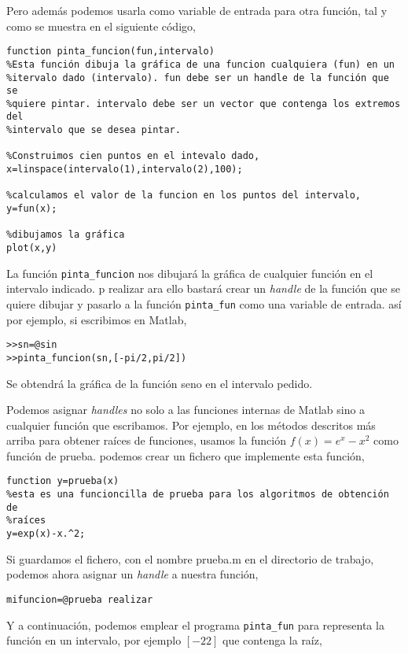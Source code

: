 Pero además podemos usarla como variable de entrada para otra función, tal y como se muestra en el siguiente código,

\begin{verbatim}
function pinta_funcion(fun,intervalo)
%Esta función dibuja la gráfica de una funcion cualquiera (fun) en un
%itervalo dado (intervalo). fun debe ser un handle de la función que se
%quiere pintar. intervalo debe ser un vector que contenga los extremos del
%intervalo que se desea pintar.

%Construimos cien puntos en el intevalo dado,
x=linspace(intervalo(1),intervalo(2),100);

%calculamos el valor de la funcion en los puntos del intervalo,
y=fun(x);

%dibujamos la gráfica
plot(x,y)
\end{verbatim}

La función \texttt{pinta\_funcion} nos dibujará la gráfica de cualquier función en el intervalo indicado. p realizar ara ello bastará crear un \emph{handle} de la función que se quiere dibujar y pasarlo a la función \texttt{pinta\_fun} como una variable de entrada. así por ejemplo, si escribimos en Matlab,

\begin{verbatim}
>>sn=@sin
>>pinta_funcion(sn,[-pi/2,pi/2])
\end{verbatim}

Se obtendrá la gráfica de la función seno en el intervalo pedido.

Podemos asignar \emph{handles} no solo a las funciones internas de Matlab sino a cualquier función que escribamos. Por ejemplo, en los métodos descritos más arriba para obtener raíces de funciones, usamos la función $f(x)=e^x-x^2$ como función de prueba. podemos crear un fichero que implemente esta función,

\begin{verbatim}
function y=prueba(x)
%esta es una funcioncilla de prueba para los algoritmos de obtención de
%raíces
y=exp(x)-x.^2;
\end{verbatim}

Si guardamos el fichero, con el nombre prueba.m en el directorio de trabajo, podemos ahora asignar un \emph{handle} a nuestra función,
\begin{verbatim}
mifuncion=@prueba realizar 
\end{verbatim}

Y a continuación, podemos emplear el programa \texttt{pinta\_fun} para representa la función en un intervalo, por ejemplo $[-2 2]$ que contenga la raíz,

